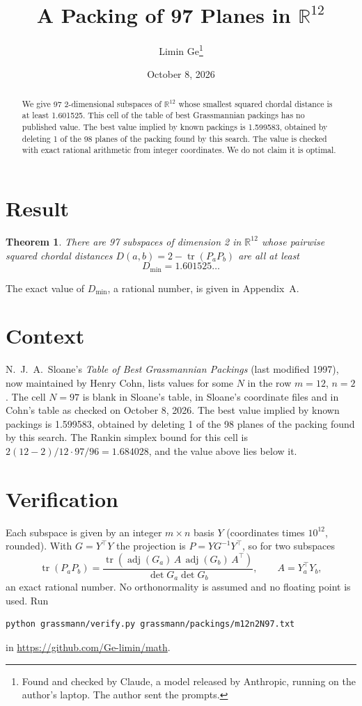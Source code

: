 \documentclass[11pt,a4paper]{article}
\title{A Packing of 97 Planes in $\mathbb{R}^{12}$}
\author{Limin Ge\thanks{Found and checked by Claude, a model released by Anthropic, running on the author's laptop. The author sent the prompts.}}
\date{October 8, 2026}
\newtheorem*{theorem}{Theorem}
\begin{document}
\maketitle
\begin{abstract}
We give 97 2-dimensional subspaces of $\mathbb{R}^{12}$ whose smallest squared chordal distance is at least 1.601525. This cell of the table of best Grassmannian packings has no published value. The best value implied by known packings is 1.599583, obtained by deleting 1 of the 98 planes of the packing found by this search. The value is checked with exact rational arithmetic from integer coordinates. We do not claim it is optimal.
\end{abstract}

\section{Result}
\begin{theorem}
There are 97 subspaces of dimension 2 in $\mathbb{R}^{12}$ whose pairwise squared chordal distances $D(a,b) = 2 - \operatorname{tr}(P_aP_b)$ are all at least
\[ D_{\min} = 1.601525\ldots \]
\end{theorem}
The exact value of $D_{\min}$, a rational number, is given in Appendix~A.


\section{Context}
N.~J.~A.~Sloane's \emph{Table of Best Grassmannian Packings} (last modified 1997), now maintained by Henry Cohn, lists values for some $N$ in the row $m=12$, $n=2$. The cell $N=97$ is blank in Sloane's table, in Sloane's coordinate files and in Cohn's table as checked on October 8, 2026. The best value implied by known packings is 1.599583, obtained by deleting 1 of the 98 planes of the packing found by this search. The Rankin simplex bound for this cell is $2(12-2)/12\cdot 97/96 = 1.684028$, and the value above lies below it.


\section{Verification}
Each subspace is given by an integer $m\times n$ basis $Y$ (coordinates times $10^{12}$, rounded). With $G=Y^\top Y$ the projection is $P=YG^{-1}Y^\top$, so for two subspaces
\[ \operatorname{tr}(P_aP_b)=\frac{\operatorname{tr}(\operatorname{adj}(G_a)\,A\,\operatorname{adj}(G_b)\,A^\top)}{\det G_a\det G_b},\qquad A=Y_a^\top Y_b, \]
an exact rational number. No orthonormality is assumed and no floating point is used. Run
\begin{verbatim}
python grassmann/verify.py grassmann/packings/m12n2N97.txt
\end{verbatim}
in \url{https://github.com/Ge-limin/math}.
\end{document}
